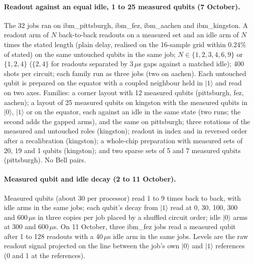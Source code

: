 \documentclass[reprint,amsmath,amssymb,aps,superscriptaddress,nofootinbib]{revtex4-2}
\newcommand{\us}{\,$\mu$s}
\begin{document}
\paragraph*{Readout against an equal idle, 1 to 25 measured qubits (7 October).} The 32 jobs ran on ibm\_pittsburgh, ibm\_fez, ibm\_aachen and ibm\_kingston. A readout arm of $N$ back-to-back readouts on a measured set and an idle arm of $N$ times the stated length (plain delay, realised on the 16-sample grid within 0.24\% of stated) on the same untouched qubits in the same job; $N\in\{1,2,3,4,6,9\}$ or $\{1,2,4\}$ ($\{2,4\}$ for readouts separated by 3\us{} gaps against a matched idle); 400 shots per circuit; each family run as three jobs (two on aachen). Each untouched qubit is prepared on the equator with a coupled neighbour held in $|1\rangle$ and read on two axes. Families: a corner layout with 12 measured qubits (pittsburgh, fez, aachen); a layout of 25 measured qubits on kingston with the measured qubits in $|0\rangle$, $|1\rangle$ or on the equator, each against an idle in the same state (two runs; the second adds the gapped arms), and the same on pittsburgh; three rotations of the measured and untouched roles (kingston); readout in index and in reversed order after a recalibration (kingston); a whole-chip preparation with measured sets of 20, 19 and 1 qubits (kingston); and two sparse sets of 5 and 7 measured qubits (pittsburgh). No Bell pairs.

\paragraph*{Measured qubit and idle decay (2 to 11 October).} Measured qubits (about 30 per processor) read 1 to 9 times back to back, with idle arms in the same jobs; each qubit's decay from $|1\rangle$ read at 0, 30, 100, 300 and 600\us{} in three copies per job placed by a shuffled circuit order; idle $|0\rangle$ arms at 300 and 600\us. On 11 October, three ibm\_fez jobs read a measured qubit after 1 to 128 readouts with a 40\us{} idle arm in the same jobs. Levels are the raw readout signal projected on the line between the job's own $|0\rangle$ and $|1\rangle$ references (0 and 1 at the references).
\end{document}
